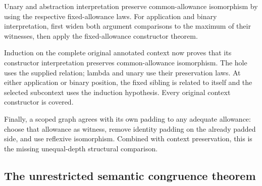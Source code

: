 




Unary and abstraction interpretation preserve common-allowance isomorphism
by using the respective fixed-allowance laws. For application and binary
interpretation, first widen both argument comparisons to the maximum of
their witnesses, then apply the fixed-allowance constructor theorem.

Induction on the complete original annotated context now proves that its
constructor interpretation preserves common-allowance isomorphism. The hole
uses the supplied relation; lambda and unary use their preservation laws.
At either application or binary position, the fixed sibling is related to
itself and the selected subcontext uses the induction hypothesis. Every
original context constructor is covered.

Finally, a scoped graph agrees with its own padding to any adequate allowance:
choose that allowance as witness, remove identity padding on the already
padded side, and use reflexive isomorphism. Combined with context preservation,
this is the missing unequal-depth structural comparison.








\subsection{The unrestricted semantic congruence theorem}

